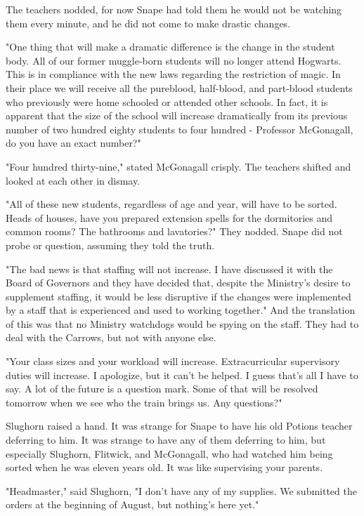 \documentclass[a4paper,11pt]{article}
\begin{document}
The teachers nodded, for now Snape had told them he would not be watching them every minute, and he did not come to make drastic changes.

"One thing that will make a dramatic difference is the change in the student body. All of our former muggle-born students will no longer attend Hogwarts. This is in compliance with the new laws regarding the restriction of magic. In their place we will receive all the pureblood, half-blood, and part-blood students who previously were home schooled or attended other schools. In fact, it is apparent that the size of the school will increase dramatically from its previous number of two hundred eighty students to four hundred - Professor McGonagall, do you have an exact number?"

"Four hundred thirty-nine," stated McGonagall crisply. The teachers shifted and looked at each other in dismay.

"All of these new students, regardless of age and year, will have to be sorted. Heads of houses, have you prepared extension spells for the dormitories and common rooms? The bathrooms and lavatories?" They nodded. Snape did not probe or question, assuming they told the truth.

"The bad news is that staffing will not increase. I have discussed it with the Board of Governors and they have decided that, despite the Ministry's desire to supplement staffing, it would be less disruptive if the changes were implemented by a staff that is experienced and used to working together." And the translation of this was that no Ministry watchdogs would be spying on the staff. They had to deal with the Carrows, but not with anyone else.

"Your class sizes and your workload will increase. Extracurricular supervisory duties will increase. I apologize, but it can't be helped. I guess that's all I have to say. A lot of the future is a question mark. Some of that will be resolved tomorrow when we see who the train brings us. Any questions?"

Slughorn raised a hand. It was strange for Snape to have his old Potions teacher deferring to him. It was strange to have any of them deferring to him, but especially Slughorn, Flitwick, and McGonagall, who had watched him being sorted when he was eleven years old. It was like supervising your parents.

"Headmaster," said Slughorn, "I don't have any of my supplies. We submitted the orders at the beginning of August, but nothing's here yet."
\end{document}
